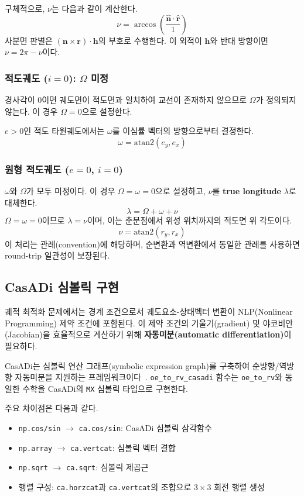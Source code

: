 \documentclass[11pt]{article}
\begin{document}
구체적으로, $\nu$는 다음과 같이 계산한다.
\[
  \nu = \arccos\left(\frac{\hat{\mathbf{n}} \cdot \hat{\mathbf{r}}}{1}\right)
\]
사분면 판별은 $(\mathbf{n} \times \mathbf{r}) \cdot \mathbf{h}$의 부호로 수행한다. 이 외적이 $\mathbf{h}$와 반대 방향이면 $\nu = 2\pi - \nu$이다.

\subsubsection{적도궤도 ($i = 0$): $\Omega$ 미정}

경사각이 0이면 궤도면이 적도면과 일치하여 교선이 존재하지 않으므로 $\Omega$가 정의되지 않는다. 이 경우 $\Omega = 0$으로 설정한다.

$e > 0$인 적도 타원궤도에서는 $\omega$를 이심률 벡터의 방향으로부터 결정한다.
\[
  \omega = \text{atan2}(e_y, e_x)
\]

\subsubsection{원형 적도궤도 ($e = 0$, $i = 0$)}

$\omega$와 $\Omega$가 모두 미정이다. 이 경우 $\Omega = \omega = 0$으로 설정하고, $\nu$를 \textbf{true longitude} $\lambda$로 대체한다.
\[
  \lambda = \Omega + \omega + \nu
\]
$\Omega = \omega = 0$이므로 $\lambda = \nu$이며, 이는 춘분점에서 위성 위치까지의 적도면 위 각도이다.
\[
  \nu = \text{atan2}(r_y, r_x)
\]
이 처리는 관례(convention)에 해당하며, 순변환과 역변환에서 동일한 관례를 사용하면 round-trip 일관성이 보장된다.

\subsection{CasADi 심볼릭 구현}

궤적 최적화 문제에서는 경계 조건으로서 궤도요소-상태벡터 변환이 NLP(Nonlinear Programming) 제약 조건에 포함된다. 이 제약 조건의 기울기(gradient) 및 야코비안(Jacobian)을 효율적으로 계산하기 위해 \textbf{자동미분(automatic differentiation)}이 필요하다.

CasADi는 심볼릭 연산 그래프(symbolic expression graph)를 구축하여 순방향/역방향 자동미분을 지원하는 프레임워크이다~\cite{Andersson2019}. \texttt{oe\_to\_rv\_casadi} 함수는 \texttt{oe\_to\_rv}와 동일한 수학을 CasADi의 \texttt{MX} 심볼릭 타입으로 구현한다.

주요 차이점은 다음과 같다.

\begin{itemize}
  \item \texttt{np.cos/sin} $\to$ \texttt{ca.cos/sin}: CasADi 심볼릭 삼각함수
  \item \texttt{np.array} $\to$ \texttt{ca.vertcat}: 심볼릭 벡터 결합
  \item \texttt{np.sqrt} $\to$ \texttt{ca.sqrt}: 심볼릭 제곱근
  \item 행렬 구성: \texttt{ca.horzcat}과 \texttt{ca.vertcat}의 조합으로 $3 \times 3$ 회전 행렬 생성
\end{itemize}
\end{document}
